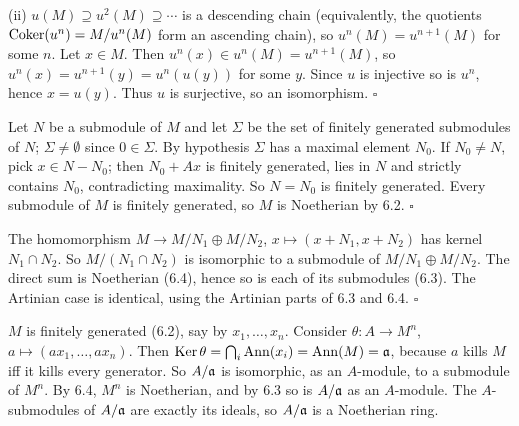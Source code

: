 \documentclass[11pt]{article}
\begin{document}
(ii) $u(M)\supseteq u^2(M)\supseteq\cdots$ is a descending chain (equivalently, the quotients $\operatorname{Coker}(u^n)=M/u^n(M)$ form an ascending chain), so $u^n(M)=u^{n+1}(M)$ for some $n$. Let $x\in M$. Then $u^n(x)\in u^n(M)=u^{n+1}(M)$, so $u^n(x)=u^{n+1}(y)=u^n(u(y))$ for some $y$. Since $u$ is injective so is $u^n$, hence $x=u(y)$. Thus $u$ is surjective, so an isomorphism. \hfill$\square$

\pf
Let $N$ be a submodule of $M$ and let $\Sigma$ be the set of finitely generated submodules of $N$; $\Sigma\ne\emptyset$ since $0\in\Sigma$. By hypothesis $\Sigma$ has a maximal element $N_0$. If $N_0\ne N$, pick $x\in N-N_0$; then $N_0+Ax$ is finitely generated, lies in $N$ and strictly contains $N_0$, contradicting maximality. So $N=N_0$ is finitely generated. Every submodule of $M$ is finitely generated, so $M$ is Noetherian by 6.2. \hfill$\square$

\pf
The homomorphism $M\to M/N_1\oplus M/N_2$, $x\mapsto(x+N_1,x+N_2)$ has kernel $N_1\cap N_2$. So $M/(N_1\cap N_2)$ is isomorphic to a submodule of $M/N_1\oplus M/N_2$. The direct sum is Noetherian (6.4), hence so is each of its submodules (6.3). The Artinian case is identical, using the Artinian parts of 6.3 and 6.4. \hfill$\square$

\pf
$M$ is finitely generated (6.2), say by $x_1,\dots,x_n$. Consider $\theta:A\to M^n$, $a\mapsto(ax_1,\dots,ax_n)$. Then $\operatorname{Ker}\theta=\bigcap_i\operatorname{Ann}(x_i)=\operatorname{Ann}(M)=\mathfrak a$, because $a$ kills $M$ iff it kills every generator. So $A/\mathfrak a$ is isomorphic, as an $A$-module, to a submodule of $M^n$. By 6.4, $M^n$ is Noetherian, and by 6.3 so is $A/\mathfrak a$ as an $A$-module. The $A$-submodules of $A/\mathfrak a$ are exactly its ideals, so $A/\mathfrak a$ is a Noetherian ring.
\end{document}
